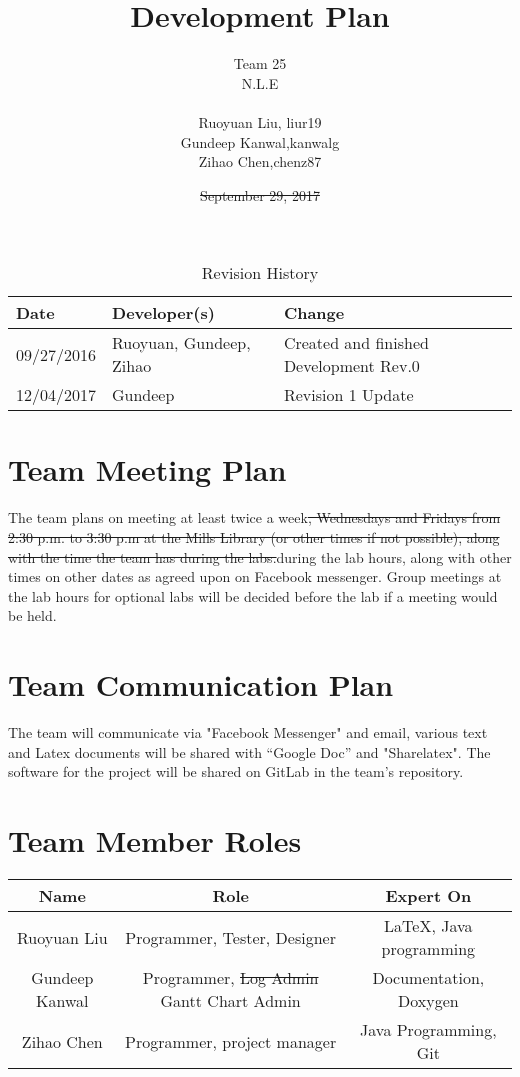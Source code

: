 \documentclass{article}
\title{Development Plan}
\author{Team 25\\N.L.E\\\\Ruoyuan Liu, liur19\\
 Gundeep Kanwal,kanwalg\\
 Zihao Chen,chenz87 }
\date{\sout{September 29, 2017} \rev{December 06, 2017}}
\newcommand{\rev}[1]{\textcolor{RevisionColour}{#1}}
\begin{document}
\maketitle
\newpage

\begin{table}[hp]
	\caption{Revision History} \label{TblRevisionHistory}
	\begin{tabularx}{\textwidth}{llX}
		\toprule
		\textbf{Date} & \textbf{Developer(s)} & \textbf{Change}\\
		\midrule
		09/27/2016 & Ruoyuan, Gundeep, Zihao & Created and finished Development Rev.0\\
		\rev{12/04/2017} & \rev{Gundeep} & \rev{Revision 1 Update}\\
		\bottomrule
	\end{tabularx}
\end{table}



\section{Team Meeting Plan}

The team plans on meeting at least twice a week\sout{, Wednesdays and Fridays from 2:30 p.m. to 3:30 p.m at the Mills Library (or other times if not possible), along with the time the team has during the labs.}\rev{during the lab hours, along with other times on other dates as agreed upon on Facebook messenger. Group meetings at the lab hours for optional labs will be decided before the lab if a meeting would be held.}

\section{Team Communication Plan}

The team will communicate via "Facebook Messenger" and email, various text and Latex documents will be shared with “Google Doc” and "Sharelatex". The software for the project will be shared on GitLab in the team's repository.

\section{Team Member Roles}
\begin{center}
\begin{tabular}{|c|c|c|}
\hline
Name & Role & Expert On\\
\hline
Ruoyuan Liu &Programmer, Tester, Designer & LaTeX, Java programming\\
\hline
Gundeep Kanwal & Programmer, \sout{Log Admin} \rev{Gantt Chart Admin}&Documentation, Doxygen\\
\hline
Zihao Chen &Programmer, project manager & Java Programming, Git\\
\hline
\end{tabular}
\end{center}
\end{document}
